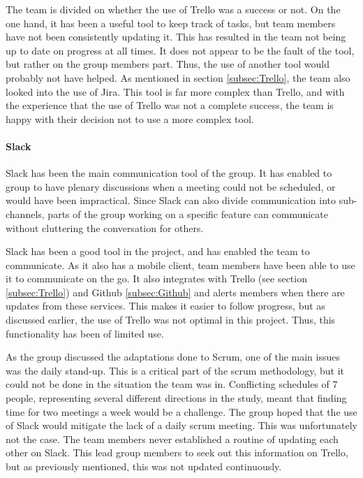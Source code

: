 \documentclass[11pt,a4paper,titlepage,oneside]{report}
\begin{document}
The team is divided on whether the use of Trello was a success or not. On the one hand, it has been a useful tool to keep track of tasks, but team members have not been consistently updating it. This has resulted in the team not being up to date on progress at all times. It does not appear to be the fault of the tool, but rather on the group members part. Thus, the use of another tool would probably not have helped. As mentioned in section \ref{subsec:Trello}, the team also looked into the use of Jira. This tool is far more complex than Trello, and with the experience that the use of Trello was not a complete success, the team is happy with their decision not to use a more complex tool. 

\paragraph{Slack}
Slack has been the main communication tool of the group. It has enabled to group to have plenary discussions when a meeting could not be scheduled, or would have been impractical. Since Slack can also divide communication into sub-channels, parts of the group working on a specific feature can communicate without cluttering the conversation for others.

Slack has been a good tool in the project, and has enabled the team to communicate. As it also has a mobile client, team members have been able to use it to communicate on the go. It also integrates with Trello (see section \ref{subsec:Trello}) and Github \ref{subsec:Github} and alerts members when there are updates from these services. This makes it easier to follow progress, but as discussed earlier, the use of Trello was not optimal in this project. Thus, this functionality has been of limited use. 

As the group discussed the adaptations done to Scrum, one of the main issues was the daily stand-up. This is a critical part of the scrum methodology, but it could not be done in the situation the team was in. Conflicting schedules of 7 people, representing several different directions in the study, meant that finding time for two meetings a week would be a challenge. The group hoped that the use of Slack would mitigate the lack of a daily scrum meeting. This was unfortunately not the case. The team members never established a routine of updating each other on Slack. This lead group members to seek out this information on Trello, but as previously mentioned, this was not updated continuously. 
\end{document}
